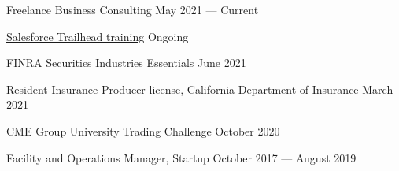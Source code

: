 Freelance Business Consulting   \hfill May 2021 --- Current

 \href{https://trailblazer.me/id/aahern8}{Salesforce Trailhead training} 	\hfill Ongoing

FINRA Securities Industries Essentials	\hfill June 2021

Resident Insurance Producer license, California Department of Insurance	\hfill March 2021

CME Group University Trading Challenge	\hfill October 2020

Facility and Operations Manager, Startup	\hfill October 2017 --- August 2019
